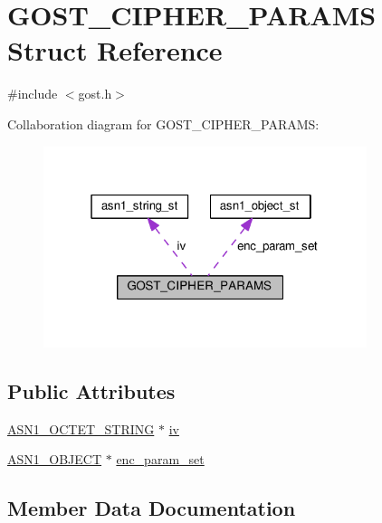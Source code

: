 \hypertarget{struct_g_o_s_t___c_i_p_h_e_r___p_a_r_a_m_s}{}\section{G\+O\+S\+T\+\_\+\+C\+I\+P\+H\+E\+R\+\_\+\+P\+A\+R\+A\+MS Struct Reference}
\label{struct_g_o_s_t___c_i_p_h_e_r___p_a_r_a_m_s}


{\ttfamily \#include $<$gost.\+h$>$}



Collaboration diagram for G\+O\+S\+T\+\_\+\+C\+I\+P\+H\+E\+R\+\_\+\+P\+A\+R\+A\+MS\+:
\nopagebreak
\begin{figure}[H]
\begin{center}
\leavevmode
\includegraphics[width=268pt]{struct_g_o_s_t___c_i_p_h_e_r___p_a_r_a_m_s__coll__graph}
\end{center}
\end{figure}
\subsection*{Public Attributes}
\begin{DoxyCompactItemize}
\item 
\hyperlink{ossl__typ_8h_afbd05e94e0f0430a2b729473efec88c1}{A\+S\+N1\+\_\+\+O\+C\+T\+E\+T\+\_\+\+S\+T\+R\+I\+NG} $\ast$ \hyperlink{struct_g_o_s_t___c_i_p_h_e_r___p_a_r_a_m_s_a0e28f39e8c9d722b9648eac967e514c4}{iv}
\item 
\hyperlink{asn1_8h_ae10c08e4e6b23f67a39b2add932ec48f}{A\+S\+N1\+\_\+\+O\+B\+J\+E\+CT} $\ast$ \hyperlink{struct_g_o_s_t___c_i_p_h_e_r___p_a_r_a_m_s_a95cc25522ba9c144283fa45771d941a4}{enc\+\_\+param\+\_\+set}
\end{DoxyCompactItemize}


\subsection{Member Data Documentation}

